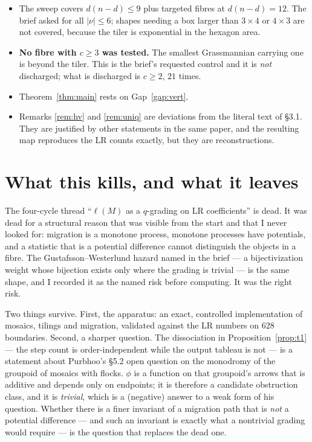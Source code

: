\documentclass[11pt]{article}
\theoremstyle{plain}
\theoremstyle{definition}
\begin{document}
\begin{itemize}
\item The sweep covers $d(n-d)\le 9$ plus targeted fibres at $d(n-d)=12$.  The
      brief asked for all $|\nu|\le 6$; shapes needing a box larger than $3\times4$
      or $4\times3$ are not covered, because the tiler is exponential in the hexagon
      area.
\item \textbf{No fibre with $c\ge3$ was tested.}  The smallest Grassmannian carrying
      one is beyond the tiler.  This is the brief's requested control and it is
      \emph{not} discharged; what is discharged is $c\ge2$, $21$ times.
\item Theorem~\ref{thm:main} rests on Gap~\ref{gap:vert}.
\item Remarks \ref{rem:hv} and \ref{rem:uniq} are deviations from the literal text of
      \S3.1.  They are justified by other statements in the same paper, and the
      resulting map reproduces the LR counts exactly, but they are reconstructions.
\end{itemize}

\section{What this kills, and what it leaves}

The four-cycle thread ``$\ell(M)$ as a $q$-grading on LR coefficients'' is dead.  It
was dead for a structural reason that was visible from the start and that I never
looked for: migration is a monotone process, monotone processes have potentials, and a
statistic that is a potential difference cannot distinguish the objects in a fibre.
The Gustafsson--Westerlund hazard named in the brief --- a bijectivization weight
whose bijection exists only where the grading is trivial --- is the same shape, and
I recorded it as the named risk before computing.  It was the right risk.

Two things survive.  First, the apparatus: an exact, controlled implementation of
mosaics, tilings and migration, validated against the LR numbers on $628$ boundaries.
Second, a sharper question.  The dissociation in Proposition~\ref{prop:t1} ---
the step count is order-independent while the output tableau is not --- is a statement
about Purbhoo's \S5.2 open question on the monodromy of the groupoid of mosaics with
flocks.  $\phi$ is a function on that groupoid's arrows that is additive and depends
only on endpoints; it is therefore a candidate obstruction class, and it is
\emph{trivial}, which is a (negative) answer to a weak form of his question.
Whether there is a finer invariant of a migration path that is \emph{not} a potential
difference --- and such an invariant is exactly what a nontrivial grading would
require --- is the question that replaces the dead one.
\end{document}
